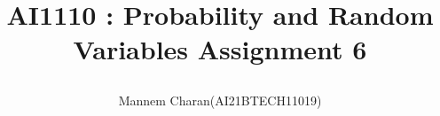 \documentclass[journal,12pt,twocolumn]{IEEEtran}
\begin{document}
	\makeatletter
	\makeatother
	
	\let\StandardTheFigure\thefigure
	\let\vec\mathbf
	
		
		
		
		\def\putbox#1#2#3{\makebox[0in][l]{\makebox[#1][l]{}\raisebox{\baselineskip}[0in][0in]{\raisebox{#2}[0in][0in]{#3}}}}
		\def\rightbox#1{\makebox[0in][r]{#1}}
		\def\centbox#1{\makebox[0in]{#1}}
		\def\topbox#1{\raisebox{-\baselineskip}[0in][0in]{#1}}
		\def\midbox#1{\raisebox{-0.5\baselineskip}[0in][0in]{#1}}

	
		
		\title{
			AI1110 : Probability and Random Variables
                                     Assignment 6 
                        
		}
		\author{ 
		            Mannem Charan(AI21BTECH11019)
		}	
		
		
		
\end{document}
